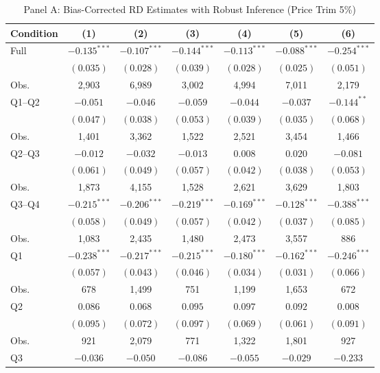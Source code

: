 \begin{table}[!htbp]
\centering
\caption{Panel A: Bias-Corrected RD Estimates with Robust Inference (Price Trim 5\%)}
\label{tab:panel_a_price5_robust}
\begin{tabular}{lcccccc}
\hline\hline
Condition & (1) & (2) & (3) & (4) & (5) & (6) \\
\hline
Full  & $-0.135^{***}$ & $-0.107^{***}$ & $-0.144^{***}$ & $-0.113^{***}$ & $-0.088^{***}$ & $-0.254^{***}$ \\
      & $(0.035)$ & $(0.028)$ & $(0.039)$ & $(0.028)$ & $(0.025)$ & $(0.051)$ \\
Obs.  & 2,903 & 6,989 & 3,002 & 4,994 & 7,011 & 2,179 \\
\addlinespace[2pt]
Q1--Q2 & $-0.051$ & $-0.046$ & $-0.059$ & $-0.044$ & $-0.037$ & $-0.144^{**}$ \\
       & $(0.047)$ & $(0.038)$ & $(0.053)$ & $(0.039)$ & $(0.035)$ & $(0.068)$ \\
Obs.   & 1,401 & 3,362 & 1,522 & 2,521 & 3,454 & 1,466 \\
\addlinespace[2pt]
Q2--Q3 & $-0.012$ & $-0.032$ & $-0.013$ & $0.008$ & $0.020$ & $-0.081$ \\
       & $(0.061)$ & $(0.049)$ & $(0.057)$ & $(0.042)$ & $(0.038)$ & $(0.053)$ \\
Obs.   & 1,873 & 4,155 & 1,528 & 2,621 & 3,629 & 1,803 \\
\addlinespace[2pt]
Q3--Q4 & $-0.215^{***}$ & $-0.206^{***}$ & $-0.219^{***}$ & $-0.169^{***}$ & $-0.128^{***}$ & $-0.388^{***}$ \\
       & $(0.058)$ & $(0.049)$ & $(0.057)$ & $(0.042)$ & $(0.037)$ & $(0.085)$ \\
Obs.   & 1,083 & 2,435 & 1,480 & 2,473 & 3,557 & 886 \\
\addlinespace[2pt]
Q1     & $-0.238^{***}$ & $-0.217^{***}$ & $-0.215^{***}$ & $-0.180^{***}$ & $-0.162^{***}$ & $-0.246^{***}$ \\
       & $(0.057)$ & $(0.043)$ & $(0.046)$ & $(0.034)$ & $(0.031)$ & $(0.066)$ \\
Obs.   & 678 & 1,499 & 751 & 1,199 & 1,653 & 672 \\
\addlinespace[2pt]
Q2     & $0.086$ & $0.068$ & $0.095$ & $0.097$ & $0.092$ & $0.008$ \\
       & $(0.095)$ & $(0.072)$ & $(0.097)$ & $(0.069)$ & $(0.061)$ & $(0.091)$ \\
Obs.   & 921 & 2,079 & 771 & 1,322 & 1,801 & 927 \\
\addlinespace[2pt]
Q3     & $-0.036$ & $-0.050$ & $-0.086$ & $-0.055$ & $-0.029$ & $-0.233$ \\

\end{tabular}
\end{table}
